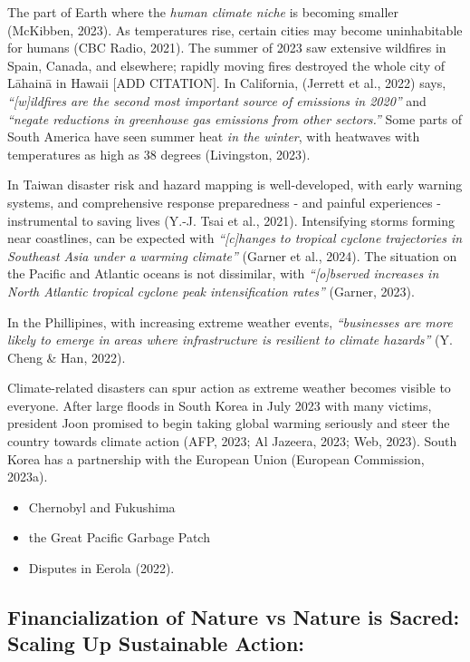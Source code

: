 \documentclass[
  letterpaper,
  DIV=11,
  numbers=noendperiod]{scrartcl}
\providecommand{\tightlist}{%
  \setlength{\itemsep}{0pt}\setlength{\parskip}{0pt}}\usepackage{longtable,booktabs,array}
\begin{document}
The part of Earth where the \emph{human climate niche} is becoming
smaller (McKibben, 2023). As temperatures rise, certain cities may
become uninhabitable for humans (CBC Radio, 2021). The summer of 2023
saw extensive wildfires in Spain, Canada, and elsewhere; rapidly moving
fires destroyed the whole city of Lāhainā in Hawaii {[}ADD CITATION{]}.
In California, (Jerrett et al., 2022) says, \emph{``{[}w{]}ildfires are
the second most important source of emissions in 2020''} and
\emph{``negate reductions in greenhouse gas emissions from other
sectors.''} Some parts of South America have seen summer heat \emph{in
the winter}, with heatwaves with temperatures as high as 38 degrees
(Livingston, 2023).

In Taiwan disaster risk and hazard mapping is well-developed, with early
warning systems, and comprehensive response preparedness - and painful
experiences - instrumental to saving lives (Y.-J. Tsai et al., 2021).
Intensifying storms forming near coastlines, can be expected with
\emph{``{[}c{]}hanges to tropical cyclone trajectories in Southeast Asia
under a warming climate''} (Garner et al., 2024). The situation on the
Pacific and Atlantic oceans is not dissimilar, with
\emph{``{[}o{]}bserved increases in North Atlantic tropical cyclone peak
intensification rates''} (Garner, 2023).

In the Phillipines, with increasing extreme weather events,
\emph{``businesses are more likely to emerge in areas where
infrastructure is resilient to climate hazards''} (Y. Cheng \& Han,
2022).

Climate-related disasters can spur action as extreme weather becomes
visible to everyone. After large floods in South Korea in July 2023 with
many victims, president Joon promised to begin taking global warming
seriously and steer the country towards climate action (AFP, 2023; Al
Jazeera, 2023; Web, 2023). South Korea has a partnership with the
European Union (European Commission, 2023a).

\begin{itemize}
\tightlist
\item
  Chernobyl and Fukushima
\item
  the Great Pacific Garbage Patch
\item
  Disputes in Eerola (2022).
\end{itemize}

\subsection{Financialization of Nature vs Nature is Sacred: Scaling Up
Sustainable
Action:}\label{financialization-of-nature-vs-nature-is-sacred-scaling-up-sustainable-action}
\end{document}
